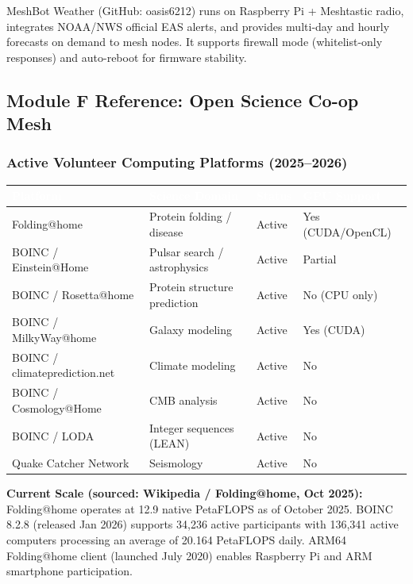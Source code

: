 \documentclass[11pt,letterpaper]{article}
\newcommand{\tableheader}[1]{\textbf{\sffamily\textcolor{white}{#1}}}
\begin{document}
MeshBot Weather (GitHub: oasis6212) runs on Raspberry Pi + Meshtastic radio, integrates NOAA/NWS official EAS alerts, and provides multi-day and hourly forecasts on demand to mesh nodes. It supports firewall mode (whitelist-only responses) and auto-reboot for firmware stability.

\subsection{Module F Reference: Open Science Co-op Mesh}

\subsubsection{Active Volunteer Computing Platforms (2025--2026)}

\begin{center}
\begin{tabularx}{\textwidth}{L{3cm}L{3cm}L{2cm}X}
\toprule
{}
\tableheader{Platform} & \tableheader{Science Domain} & \tableheader{Status} & \tableheader{GPU Support} \\
\midrule
Folding@home & Protein folding / disease & Active & Yes (CUDA/OpenCL) \\
BOINC / Einstein@Home & Pulsar search / astrophysics & Active & Partial \\
BOINC / Rosetta@home & Protein structure prediction & Active & No (CPU only) \\
BOINC / MilkyWay@home & Galaxy modeling & Active & Yes (CUDA) \\
BOINC / climateprediction.net & Climate modeling & Active & No \\
BOINC / Cosmology@Home & CMB analysis & Active & No \\
BOINC / LODA & Integer sequences (LEAN) & Active & No \\
Quake Catcher Network & Seismology & Active & No \\
\bottomrule
\end{tabularx}
\end{center}

\textbf{Current Scale (sourced: Wikipedia / Folding@home, Oct 2025):} Folding@home operates at 12.9 native PetaFLOPS as of October 2025. BOINC 8.2.8 (released Jan 2026) supports 34,236 active participants with 136,341 active computers processing an average of 20.164 PetaFLOPS daily. ARM64 Folding@home client (launched July 2020) enables Raspberry Pi and ARM smartphone participation.
\end{document}

